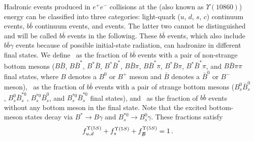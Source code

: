Hadronic events produced in $e^+e^-$ collisions at the \Upsfive (also known as
$\Upsilon(10860)$) energy can be classified into three categories: 
light-quark ($u$, $d$, $s$, $c$) continuum events, $b\bar{b}$ continuum events,
and \Upsfive events. The latter two cannot be distinguished and will be called
$b\bar{b}$ events in the following. These $b\bar{b}$ events, which also include 
$b\bar{b}\gamma$ events because of possible initial-state radiation, 
can hadronize in different final states.
We define \fudfive\ as
the fraction of $b\bar{b}$ events with a pair of non-strange 
bottom mesons 
($B\bar{B}$, $B\bar{B}^*$, $B^*\bar{B}$, $B^*\bar{B}^*$,
$B\bar{B}\pi$, $B\bar{B}^*\pi$, $B^*\bar{B}\pi$,
$B^*\bar{B}^*\pi$, and $B\bar{B}\pi\pi$ final states, 
where
$B$ denotes a $B^0$ or $B^+$ meson and 
$\bar{B}$ denotes a $\bar{B}^0$ or $B^-$ meson), \fsfive\ as
the fraction of $b\bar{b}$ events with a pair of strange bottom mesons
($B_s^0\bar{B}_s^0$, $B_s^0\bar{B}_s^{*0}$, $B_s^{*0}\bar{B}_s^0$, and
$B_s^{*0}\bar{B}_s^{*0}$ final states), and 
\fnBfive\ as the fraction of $b\bar{b}$ events without 
any bottom meson in the final state.
Note that the excited bottom-meson states decay via $B^* \to B \gamma$ and
$B_s^{*0} \to B_s^0 \gamma$.
These fractions satisfy
\begin{equation}
\fudfive + \fsfive + \fnBfive = 1 \,.
\labe{sum_frac_five}
\end{equation} 

